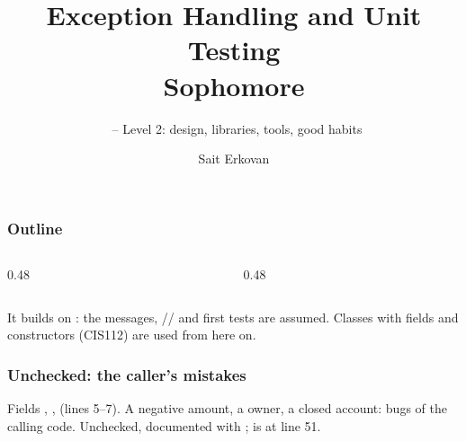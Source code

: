 \documentclass[aspectratio=169,10pt,compress]{beamer}
\title[Exceptions, Tests: Sophomore]{
	Exception Handling and Unit Testing\\
	Sophomore
}
\subtitle{
	\cisOOO\ -- Level 2: design, libraries, tools, good habits
}
\author[Erkovan]{Sait Erkovan}
\institute[FCIS]{
	Faculty of Computer and Information Sciences\\
	Yeditepe University
}
\date{{\tiny \hbTimeStamp}}
\begin{document}
\begin{frame}[t,fragile]
	\titlepage
\end{frame}




\begin{frame}[t,fragile] \frametitle{Outline}
	\begin{columns}[T]
		\begin{column}{0.48\textwidth}
			\tableofcontents[sections={1-3}, hideallsubsections]
		\end{column}
		\begin{column}{0.48\textwidth}
			\tableofcontents[sections={4-7}, hideallsubsections]
		\end{column}
	\end{columns}

	\vspace{1em}
	\small It builds on : the messages, // and first tests are assumed.
	Classes with fields and constructors (CIS112) are used from here on.
\end{frame}








\begin{frame}[t,fragile] \frametitle{Unchecked: the caller's mistakes}

	\footnotesize Fields , ,  (lines 5--7). A negative amount, a  owner, a closed
	account: bugs of the calling code. Unchecked, documented with ;  is at line 51.
\end{frame}
\end{document}
